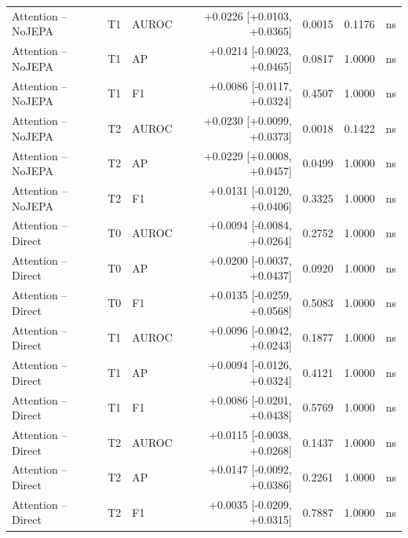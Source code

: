 \begin{table}[t]
\begin{tabular}{lllrrrc}
Attention -- NoJEPA & T1 & AUROC & +0.0226 [+0.0103, +0.0365] & 0.0015 & 0.1176 & ns \\
Attention -- NoJEPA & T1 & AP & +0.0214 [-0.0023, +0.0465] & 0.0817 & 1.0000 & ns \\
Attention -- NoJEPA & T1 & F1 & +0.0086 [-0.0117, +0.0324] & 0.4507 & 1.0000 & ns \\
Attention -- NoJEPA & T2 & AUROC & +0.0230 [+0.0099, +0.0373] & 0.0018 & 0.1422 & ns \\
Attention -- NoJEPA & T2 & AP & +0.0229 [+0.0008, +0.0457] & 0.0499 & 1.0000 & ns \\
Attention -- NoJEPA & T2 & F1 & +0.0131 [-0.0120, +0.0406] & 0.3325 & 1.0000 & ns \\
Attention -- Direct & T0 & AUROC & +0.0094 [-0.0084, +0.0264] & 0.2752 & 1.0000 & ns \\
Attention -- Direct & T0 & AP & +0.0200 [-0.0037, +0.0437] & 0.0920 & 1.0000 & ns \\
Attention -- Direct & T0 & F1 & +0.0135 [-0.0259, +0.0568] & 0.5083 & 1.0000 & ns \\
Attention -- Direct & T1 & AUROC & +0.0096 [-0.0042, +0.0243] & 0.1877 & 1.0000 & ns \\
Attention -- Direct & T1 & AP & +0.0094 [-0.0126, +0.0324] & 0.4121 & 1.0000 & ns \\
Attention -- Direct & T1 & F1 & +0.0086 [-0.0201, +0.0438] & 0.5769 & 1.0000 & ns \\
Attention -- Direct & T2 & AUROC & +0.0115 [-0.0038, +0.0268] & 0.1437 & 1.0000 & ns \\
Attention -- Direct & T2 & AP & +0.0147 [-0.0092, +0.0386] & 0.2261 & 1.0000 & ns \\
Attention -- Direct & T2 & F1 & +0.0035 [-0.0209, +0.0315] & 0.7887 & 1.0000 & ns \\
\bottomrule
\end{tabular}
\end{table}
